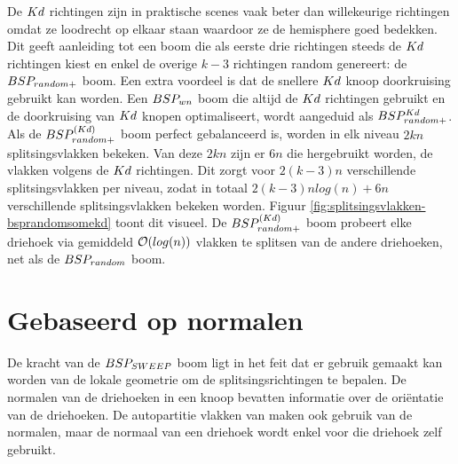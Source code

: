 De $Kd$ richtingen zijn in praktische scenes vaak beter dan willekeurige richtingen omdat ze loodrecht op elkaar staan waardoor ze de hemisphere goed bedekken.
Dit geeft aanleiding tot een boom die als eerste drie richtingen steeds de $Kd$ richtingen kiest en enkel de overige $k - 3$ richtingen random genereert: de $BSP_{random+}$ boom. Een extra voordeel is dat de snellere $Kd$ knoop doorkruising gebruikt kan worden. Een $BSP_{wn}$ boom die altijd de $Kd$ richtingen gebruikt en de doorkruising van $Kd$ knopen optimaliseert, wordt aangeduid als $BSP^{Kd}_{random+}$. 
Als de $BSP^{(Kd)}_{random+}$ boom perfect gebalanceerd is, worden in elk niveau $2kn$ splitsingsvlakken bekeken.
Van deze $2kn$ zijn er $6n$ die hergebruikt worden, de vlakken volgens de $Kd$ richtingen.
Dit zorgt voor $2(k-3)n$ verschillende splitsingsvlakken per niveau, zodat in totaal $2(k-3)nlog(n) + 6n$ verschillende splitsingsvlakken bekeken worden.
Figuur \ref{fig:splitsingsvlakken-bsprandomsomekd} toont dit visueel.
De $BSP^{(Kd)}_{random+}$ boom probeert elke driehoek via gemiddeld $\mathcal{O}(log(n))$ vlakken te splitsen van de andere driehoeken, net als  de $BSP_{random}$ boom.\\



\section{Gebaseerd op normalen}
    De kracht van de $BSP_{SWEEP}$ boom ligt in het feit dat er gebruik gemaakt kan worden van de lokale geometrie om de splitsingsrichtingen te bepalen.
    De normalen van de driehoeken in een knoop bevatten informatie over de oriëntatie van de driehoeken.
    De autopartitie vlakken van \authorIze{} maken ook gebruik van de normalen, maar de normaal van een driehoek wordt enkel voor die driehoek zelf gebruikt.
    
